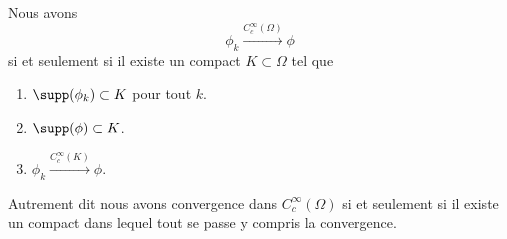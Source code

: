 \begin{proposition}		\label{PROPooRAZSooDttIbK}
	Nous avons
	\begin{equation}
		\phi_k\stackrel{ C^{\infty}_c(\Omega)}{\longrightarrow} \phi
	\end{equation}
	si et seulement si il existe un compact \( K\subset \Omega\) tel que
	\begin{enumerate}
		\item
		      \( \supp(\phi_k)\subset K\) pour tout \( k\).
		\item
		      \( \supp(\phi)\subset K\).
		\item
		      \( \phi_k\stackrel{ C^{\infty}_c(K)}{\longrightarrow} \phi\).
	\end{enumerate}
	Autrement dit nous avons convergence dans \( C^{\infty}_c(\Omega)\) si et seulement si il existe un compact dans lequel tout se passe y compris la convergence.
\end{proposition}

